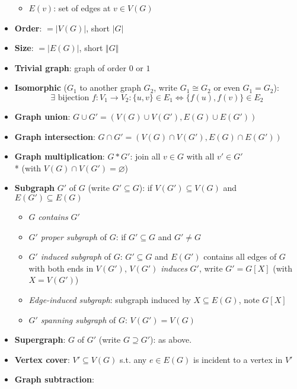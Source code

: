 \begin{itemize}
\begin{itemize}
    \item $ E(v) $: set of edges at $ v \in V(G) $
  \end{itemize}
  \item \textbf{Order}: $ = \vert V(G) \vert $, short $ \vert G \vert $
  \item \textbf{Size}: $ = \vert E(G) \vert $, short $ \Vert G \Vert $
  \item \textbf{Trivial graph}: graph of order $ 0 $ or $ 1 $
  \item \textbf{Isomorphic} ($ G_1 $ to another graph $ G_2 $, write $ G_1 \cong G_2 $ or even $ G_1 = G_2 $):
    \begin{equation*}
      \exists \text{ bijection } f: V_1 \to V_2 : \{ u,v \} \in E_1 \Leftrightarrow \{ f(u),f(v) \} \in E_2
    \end{equation*}
  \item \textbf{Graph union}: $ G \cup G' = (V(G) \cup V(G'), E(G) \cup E(G')) $
  \item \textbf{Graph intersection}: $ G \cap G' = (V(G) \cap V(G'), E(G) \cap E(G')) $
  \item \textbf{Graph multiplication}: $ G * G' $: join all $ v \in G $ with all $ v' \in G' $ \\* (with $ V(G) \cap V(G') = \varnothing $)
  \item \textbf{Subgraph} $ G' $ of $ G $ (write $ G' \subseteq G $): if $ V(G') \subseteq V(G) $ and $ E(G') \subseteq E(G) $
  \begin{itemize}
    \item $ G $ \emph{contains} $ G' $ 
    \item $ G' $ \emph{proper subgraph} of $ G $: if $ G' \subseteq G $ and $ G' \neq G $
    \item $ G' $ \emph{induced subgraph} of $ G $: $ G' \subseteq G $ and $ E(G') $ contains all edges of $ G $ with both ends in $ V(G') $, $ V(G') $ \emph{induces} $ G' $, write $ G' = G[X] $ (with $ X = V(G') $)
    \item \emph{Edge-induced subgraph}: subgraph induced by $ X \subseteq E(G) $, note $ G[X] $
    \item $ G' $ \emph{spanning subgraph} of $ G $: $ V(G') = V(G) $
  \end{itemize}
  \item \textbf{Supergraph}: $ G $ of $ G' $ (write $ G \supseteq G' $): as above.
  \item \textbf{Vertex cover}: $ V' \subseteq V(G) $ s.t. any $ e \in E(G) $ is incident to a vertex in $ V' $ 
  \item \textbf{Graph subtraction}:

\end{itemize}
